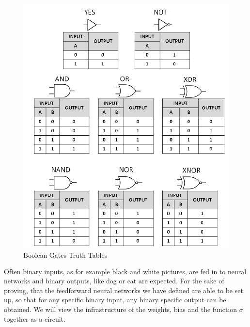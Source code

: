 \documentclass{article}
\theoremstyle{definition}
\newcommand*{\figuretitle}[1]{%
    {\centering%
    \textbf{#1}%
    \par\medskip}%
}
\begin{document}
\begin{figure}
\centering
\includegraphics[scale=0.2]{graphics/Summary-of-the-common-Boolean-logic-gates-with-symbols-and-truth-tables.png}
\caption{Boolean Gates Truth Tables}
\label{fig:bool_gate}
\end{figure}

Often binary inputs, as for example black and white pictures, are fed in to neural networks and binary outputs, like dog or cat are expected. For the sake of proving, that the feedforward neural networks we have defined are able to be set up, so that for any specific binary input, any binary specific output can be obtained. We will view the infrastructure of the weights, bias and the function $\sigma$ together as a circuit. 
\end{document}
